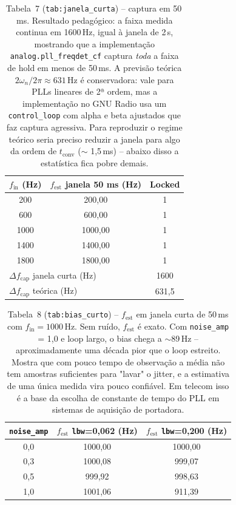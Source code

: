 \documentclass[11pt,a4paper]{article}
\begin{document}
\begin{table}[H]
  \centering
  \begin{tabular}{c c c}
    \toprule
    $f_\text{in}$ (Hz) & $f_\text{est}$ janela 50 ms (Hz) & Locked \\
    \midrule
    200  & 200{,}00  & 1 \\
    600  & 600{,}00  & 1 \\
    1000 & 1000{,}00 & 1 \\
    1400 & 1400{,}00 & 1 \\
    1800 & 1800{,}00 & 1 \\
    \midrule
    \multicolumn{2}{l}{$\Delta f_\text{cap}$ janela curta (Hz)} & 1600 \\
    \multicolumn{2}{l}{$\Delta f_\text{cap}$ teórica (Hz)} & 631{,}5 \\
    \bottomrule
  \end{tabular}
  \caption{Tabela~7 (\texttt{tab:janela\_curta}) -- captura em 50\,ms. Resultado pedagógico: a faixa medida continua em 1600\,Hz, igual à janela de 2\,s, mostrando que a implementação \texttt{analog.pll\_freqdet\_cf} captura \emph{toda} a faixa de hold em menos de 50\,ms. A previsão teórica $2\omega_n/2\pi \approx 631$\,Hz é conservadora: vale para PLLs lineares de 2ª ordem, mas a implementação no GNU Radio usa um \texttt{control\_loop} com alpha e beta ajustados que faz captura agressiva. Para reproduzir o regime teórico seria preciso reduzir a janela para algo da ordem de $t_\text{conv}$ ($\sim$ 1,5\,ms) -- abaixo disso a estatística fica pobre demais.}
\end{table}

\begin{table}[H]
  \centering
  \begin{tabular}{c c c}
    \toprule
    \texttt{noise\_amp} & $f_\text{est}$ \texttt{lbw}=0{,}062 (Hz) & $f_\text{est}$ \texttt{lbw}=0{,}200 (Hz) \\
    \midrule
    0{,}0 & 1000{,}00 & 1000{,}00 \\
    0{,}3 & 1000{,}08 & 999{,}07  \\
    0{,}5 & 999{,}92  & 998{,}63  \\
    1{,}0 & 1001{,}06 & 911{,}39  \\
    \bottomrule
  \end{tabular}
  \caption{Tabela~8 (\texttt{tab:bias\_curto}) -- $f_\text{est}$ em janela curta de 50\,ms com $f_\text{in} = 1000$\,Hz. Sem ruído, $f_\text{est}$ é exato. Com \texttt{noise\_amp} = 1{,}0 e loop largo, o bias chega a $\sim$89\,Hz -- aproximadamente uma década pior que o loop estreito. Mostra que com pouco tempo de observação a média não tem amostras suficientes para "lavar" o jitter, e a estimativa de uma única medida vira pouco confiável. Em telecom isso é a base da escolha de constante de tempo do PLL em sistemas de aquisição de portadora.}
\end{table}
\end{document}
